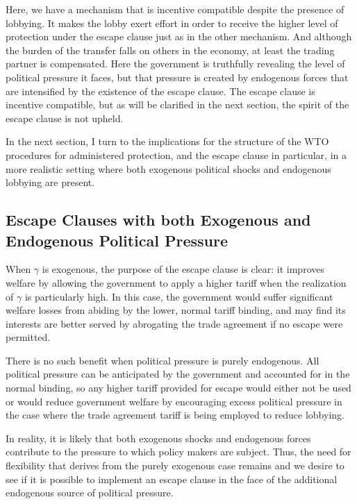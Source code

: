 \documentclass[12pt,titlepage]{article}
\newcommand{\ga}{\gamma}
\begin{document}

Here, we have a mechanism that is incentive compatible despite the presence of lobbying. It makes the lobby exert effort in order to receive the higher level of protection under the escape clause just as in the other mechanism. And although the burden of the transfer falls on others in the economy, at least the trading partner is compensated. Here the government is truthfully revealing the level of political pressure it faces, but that pressure is created by endogenous forces that are intensified by the existence of the escape clause. The escape clause is incentive compatible, but as will be clarified in the next section, the spirit of the escape clause is not upheld.

In the next section, I turn to the implications for the structure of the WTO procedures for administered protection, and the escape clause in particular, in a more realistic setting where both exogenous political shocks and endogenous lobbying are present.


\subsection{Escape Clauses with both Exogenous and Endogenous Political Pressure}
\label{sec:escape2}
When $\ga$ is exogenous, the purpose of the escape clause is clear: it improves welfare by allowing the government to apply a higher tariff when the realization of $\ga$ is particularly high. In this case, the government would suffer significant welfare losses from abiding by the lower, normal tariff binding, and may find its interests are better served by abrogating the trade agreement if no escape were permitted.

There is no such benefit when political pressure is purely endogenous. All political pressure can be anticipated by the government and accounted for in the normal binding, so any higher tariff provided for escape would either not be used or would reduce government welfare by encouraging excess political pressure in the case where the trade agreement tariff is being employed to reduce lobbying.

In reality, it is likely that both exogenous shocks and endogenous forces contribute to the pressure to which policy makers are subject. Thus, the need for flexibility that derives from the purely exogenous case remains and we desire to see if it is possible to implement an escape clause in the face of the additional endogenous source of political pressure.
\end{document}
